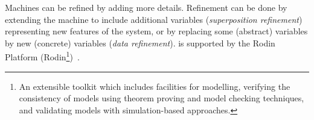 Machines can be refined by adding more details.  Refinement can be done by extending the machine 
to include additional variables (\emph{superposition refinement}) representing new features of 
the system, or by replacing some (abstract) variables by new (concrete) variables (\emph{data refinement}).  
\EventB is supported by the Rodin Platform (Rodin\footnote{An extensible toolkit which includes 
facilities for modelling, verifying the consistency of models using theorem proving and model 
checking techniques, and validating models with simulation-based approaches.})~\cite{abrial10:_rodin}.

